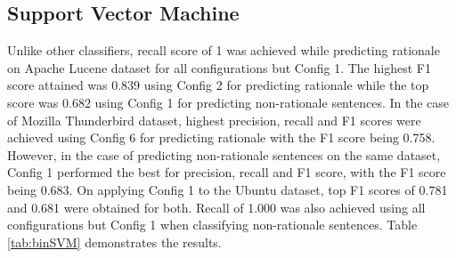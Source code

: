 \documentclass[a4paper,12pt,twoside]{report}
\begin{document}
\subsection{Support Vector Machine}
Unlike other classifiers, recall score of 1 was achieved while predicting rationale on Apache Lucene dataset for all configurations but Config 1. The highest F1 score attained was 0.839 using Config 2 for predicting rationale while the top score was 0.682 using Config 1 for predicting non-rationale sentences. In the case of Mozilla Thunderbird dataset, highest precision, recall and F1 scores were achieved using Config 6 for predicting rationale with the F1 score being 0.758. However, in the case of predicting non-rationale sentences on the same dataset, Config 1 performed the best for precision, recall and F1 score, with the F1 score being 0.683. On applying Config 1 to the Ubuntu dataset, top F1 scores of 0.781 and 0.681 were obtained for both. Recall of 1.000 was also achieved using all configurations but Config 1 when classifying non-rationale sentences. Table \ref{tab:binSVM} demonstrates the results. 
\end{document}
